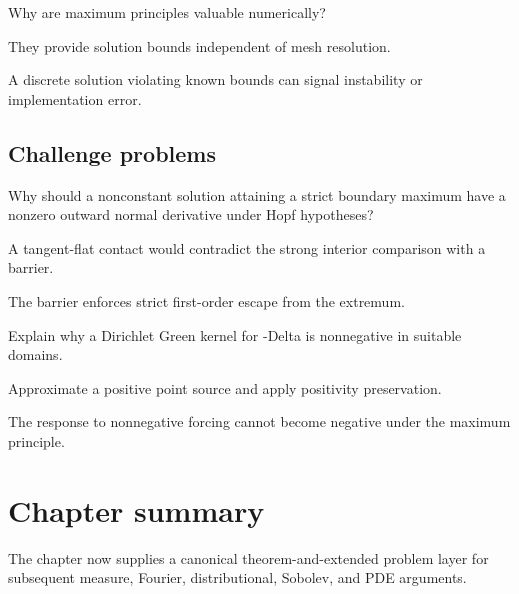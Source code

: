 \begin{exercise}\label{exr:iii27-expand-14}
Why are maximum principles valuable numerically?
\end{exercise}
\begin{hint}
They provide solution bounds independent of mesh resolution.
\end{hint}
\begin{solution}
A discrete solution violating known bounds can signal instability or implementation error.
\end{solution}

\subsection*{Challenge problems}

\begin{exercise}\label{exr:iii27-expand-15}
Why should a nonconstant solution attaining a strict boundary maximum have a nonzero outward normal derivative under Hopf hypotheses?
\end{exercise}
\begin{hint}
A tangent-flat contact would contradict the strong interior comparison with a barrier.
\end{hint}
\begin{solution}
The barrier enforces strict first-order escape from the extremum.
\end{solution}

\begin{exercise}\label{exr:iii27-expand-16}
Explain why a Dirichlet Green kernel for -Delta is nonnegative in suitable domains.
\end{exercise}
\begin{hint}
Approximate a positive point source and apply positivity preservation.
\end{hint}
\begin{solution}
The response to nonnegative forcing cannot become negative under the maximum principle.
\end{solution}
\section*{Chapter summary}
The chapter now supplies a canonical theorem-and-extended problem layer for subsequent measure, Fourier, distributional, Sobolev, and PDE arguments.
